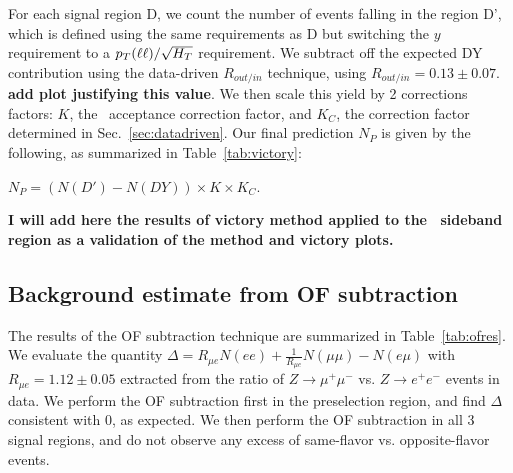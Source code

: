 For each signal region D, we count the number of events falling in the region D', which is defined
using the same requirements as D but switching the $y$ requirement to a $p_T(\ell\ell)/\sqrt{H_T}$ requirement.
We subtract off the expected DY contribution using the data-driven $R_{out/in}$ technique, using $R_{out/in} = 0.13 \pm 0.07$.
{\color{red} \bf add plot justifying this value}. We then scale this yield by 2 corrections factors:
$K$, the \met\ acceptance correction factor, and $K_C$, the correction factor determined in Sec.~\ref{sec:datadriven}.
Our final prediction $N_P$ is given by the following, as summarized in Table~\ref{tab:victory}:

\begin{center}
$ N_P = (N(D')-N(DY)) \times K \times K_C$.
\end{center}

{\color{red} \bf I will add here the results of victory method applied to the \Ht\ sideband region as a validation of the method and victory plots.}

\subsection{Background estimate from OF subtraction}
\label{sec:ofres}

The results of the OF subtraction technique are summarized in Table~\ref{tab:ofres}. 
We evaluate the quantity $\Delta = R_{\mu e}N(ee) + \frac{1}{R_{\mu e}}N(\mu\mu) - N(e\mu)$ with $R_{\mu e} = 1.12 \pm 0.05$
extracted from the ratio of $Z \to \mu^+\mu^-$ vs. $Z \to e^+e^-$ events in data.
We perform the OF subtraction first in the preselection region, and find $\Delta$ consistent with 0, as expected.
We then perform the OF subtraction in all 3 signal regions, and do not observe any excess of same-flavor vs. opposite-flavor events.

